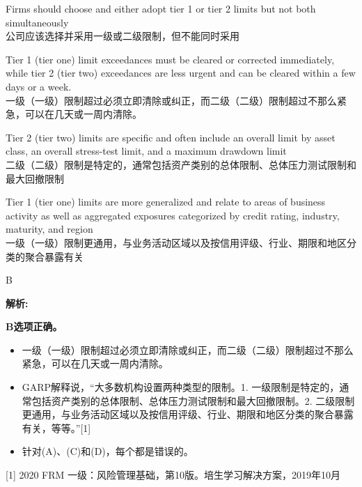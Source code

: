 \documentclass{article}
\newenvironment{explanation}
{\textbf{解析:}\par}
{\par}
\begin{document}
\begin{choices}
    \item Firms should choose and either adopt tier 1 or tier 2 limits but not both simultaneously
    \\公司应该选择并采用一级或二级限制，但不能同时采用
    \item Tier 1 (tier one) limit exceedances must be cleared or corrected immediately, while tier 2 (tier two) exceedances are less urgent and can be cleared within a few days or a week.
    \\一级（一级）限制超过必须立即清除或纠正，而二级（二级）限制超过不那么紧急，可以在几天或一周内清除。
    \item Tier 2 (tier two) limits are specific and often include an overall limit by asset class, an overall stress-test limit, and a maximum drawdown limit
    \\二级（二级）限制是特定的，通常包括资产类别的总体限制、总体压力测试限制和最大回撤限制
    \item Tier 1 (tier one) limits are more generalized and relate to areas of business activity as well as aggregated exposures categorized by credit rating, industry, maturity, and region
    \\一级（一级）限制更通用，与业务活动区域以及按信用评级、行业、期限和地区分类的聚合暴露有关
\end{choices}

\begin{correctanswer}
    B
\end{correctanswer}

\begin{explanation}
    \textbf{B选项正确。} 
    \begin{itemize}
        \item 一级（一级）限制超过必须立即清除或纠正，而二级（二级）限制超过不那么紧急，可以在几天或一周内清除。
    \end{itemize}
    
    \begin{itemize}
        \item GARP解释说，“大多数机构设置两种类型的限制。1. 一级限制是特定的，通常包括资产类别的总体限制、总体压力测试限制和最大回撤限制。2. 二级限制更通用，与业务活动区域以及按信用评级、行业、期限和地区分类的聚合暴露有关，等等。”[1]
        \item 针对(A)、(C)和(D)，每个都是错误的。
    \end{itemize}
   [1] 2020 FRM 一级：风险管理基础，第10版。培生学习解决方案，2019年10月
\end{explanation}
\end{document}
